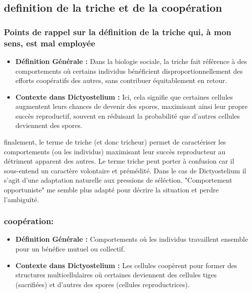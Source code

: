 \documentclass[twocolumn,10pt]{article} %
\begin{document}
    \subsection{definition de la triche et de la coopération}
                \subsubsection{Points de rappel sur la définition de la triche qui, à mon sens, est mal employée}
                    \begin{itemize}
                        \item \textbf{Définition Générale :} Dans la biologie sociale, la triche fait référence à des comportements où certains individus
                        bénéficient disproportionnellement des efforts coopératifs des autres, sans contribuer équitablement en retour.
                        \item \textbf{Contexte dans Dictyostelium :} Ici, cela signifie que certaines cellules augmentent leurs chances de devenir des
                        spores, maximisant ainsi leur propre succès reproductif, souvent en réduisant la probabilité que d'autres
                        cellules deviennent des spores.
                    \end{itemize}

                    finalement, le terme de triche (et donc tricheur) permet de caractériser les comportements (ou les individus) maximisant
                    leur succès reproducteur au détriment apparent des autres. Le terme triche peut porter à confusion car il sous-entend un caractère
                    volontaire et prémédité. Dans le cas de Dictyostelium il s'agit d'une adaptation naturelle aux pressions de séléction. 
                    "Comportement opportuniste" me semble plus adapté pour décrire la situation et perdre l'ambiguïté. 

                \subsubsection{coopération:}
                    \begin{itemize}
                        \item \textbf{Définition Générale :} Comportements où les individus travaillent ensemble pour un bénéfice mutuel ou collectif.
                        \item \textbf{Contexte dans Dictyostelium :} Les cellules coopèrent pour former des structures multicellulaires où certaines 
                        deviennent des cellules tiges (sacrifiées) et d'autres des spores (cellules reproductrices).
                    \end{itemize}
\end{document}
